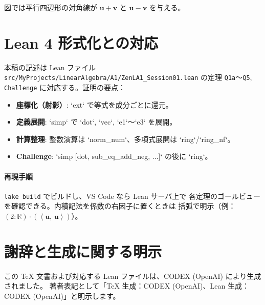\documentclass[luatexja,ja=standard,a4paper,12pt]{bxjsarticle}
\newcommand{\R}{\mathbb{R}}
\newcommand{\ip}[2]{\left\langle #1,\,#2 \right\rangle}
\newcommand{\vv}[1]{\bm{#1}}
\begin{document}
\begin{center}
\end{center}

図では平行四辺形の対角線が \(\vv u+\vv v\) と \(\vv u-\vv v\) を与える。

\section{Lean 4 形式化との対応}
本稿の記述は Lean ファイル
\texttt{src/MyProjects/LinearAlgebra/A1/ZenLA1\_Session01.lean} の定理
\texttt{Q1a}〜\texttt{Q5}, \texttt{Challenge} に対応する。証明の要点：
\begin{itemize}
 \item \textbf{座標化（射影）}: `ext` で等式を成分ごとに還元。
 \item \textbf{定義展開}: `simp` で `dot`, `vec`, `e1`〜`e3` を展開。
 \item \textbf{計算整理}: 整数演算は `norm_num`、多項式展開は `ring`/`ring_nf`。
 \item \textbf{Challenge}: `simp [dot, sub_eq_add_neg, ...]` の後に `ring`。
\end{itemize}

\paragraph{再現手順} \texttt{lake build} でビルドし、VS Code なら Lean サーバ上で
各定理のゴールビューを確認できる。内積記法を係数の右因子に置くときは
括弧で明示（例：\( (2:\R)\cdot(\ip{\vv u}{\vv u}) \)）。

\section*{謝辞と生成に関する明示}
この TeX 文書および対応する Lean ファイルは、CODEX (OpenAI) により生成されました。
著者表記として「TeX 生成：CODEX (OpenAI)、Lean 生成：CODEX (OpenAI)」と明示します。
\end{document}
